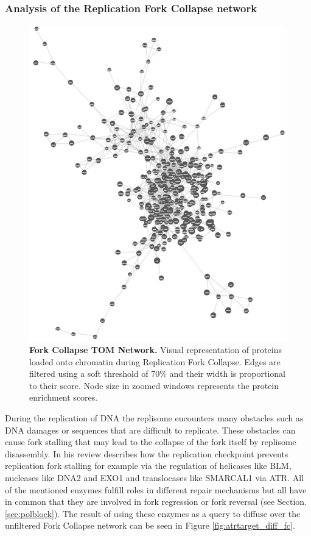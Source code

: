 \subsubsection{Analysis of the Replication Fork Collapse network}
\begin{figure}[H]
    \centering
    \includegraphics[width=.8\textwidth]{resources/images/Results/FC_networkplot.png}
    \caption[Fork Collapse TOM Network]{\textbf{Fork Collapse TOM Network. }Visual representation of proteins loaded onto chromatin during Replication Fork Collapse. Edges are filtered using a soft threshold of 70\% and their width  is proportional to their score. Node size in zoomed windows represents the protein enrichment scores.}
    \label{fig:FCtom}
\end{figure}
During the replication of DNA the replisome encounters many obstacles such as DNA damages or sequences that are difficult to replicate. These obstacles can cause fork stalling that may lead to the collapse of the fork itself by replisome disassembly. In his review \cite{Cortez.2015} describes how the replication checkpoint prevents replication fork stalling for example via the regulation of helicases like BLM, nucleases like DNA2 and EXO1 and translocases like SMARCAL1 via ATR.
All of the mentioned enzymes fulfill roles in different repair mechanisms but all have in common that they are involved in fork regression or fork reversal (see Section. \ref{sec:polblock}). The result of using these enzymes as a query to diffuse over the unfiltered Fork Collapse network can be seen in Figure \ref{fig:atrtarget_diff_fc}.
